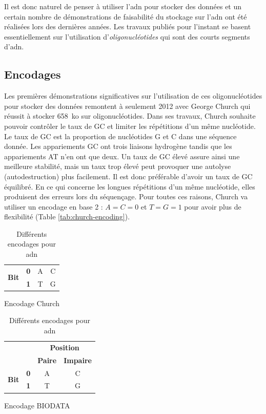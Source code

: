 \documentclass[a4paper]{report}
\begin{document}
Il est donc naturel de penser à utiliser l’\ac{adn} pour stocker des données
et un certain nombre de démonstrations de faisabilité du stockage sur l’\ac{adn} ont été réalisées lors des dernières années.
Les travaux publiés pour l’instant se basent essentiellement sur l’utilisation d’\emph{oligonucléotides} qui sont des courts segments d’\ac{adn}.

\subsection{Encodages}

Les premières démonstrations significatives sur l’utilisation de ces oligonucléotides pour stocker des données remontent à seulement 2012 avec George Church \cite{church2012next} qui réussit à stocker 658~ko sur  oligonucléotides.
Dans ses travaux, Church souhaite pouvoir contrôler le taux de GC et limiter les répétitions d’un même nucléotide.
Le taux de GC est la proportion de nucléotides G et C dans une séquence donnée. 
Les appariements GC ont trois liaisons hydrogène tandis que les appariements AT n'en ont que deux.
Un taux de GC élevé assure ainsi une meilleure stabilité, mais un taux trop élevé peut provoquer une autolyse (autodestruction) plus facilement.
Il est donc préférable d’avoir un taux de GC équilibré.
En ce qui concerne les longues répétitions d’un même nucléotide, elles produisent des erreurs lors du séquençage.
Pour toutes ces raisons, Church va utiliser un encodage en base 2 : $A=C=0$ et $T=G=1$ pour avoir plus de flexibilité (Table \ref{tab:church-encoding}).

\begin{table}[ht]
\centering
\setlength{\tabcolsep}{.8em}
\renewcommand\arraystretch{1.5}

\begin{subtable}[t]{.45\textwidth}
  \centering
  \begin{tabular}{|c|c|c|c|}
  \hline
  \multirow{2}{*}{\textbf{Bit}} & \textbf{0} & A & C \\
  \cline{2-4}
  & \textbf{1} & T & G \\
  \hline
  \end{tabular}
  \caption{Encodage Church}
  \label{tab:church-encoding}
\end{subtable}
\hfill
\begin{subtable}[t]{.54\textwidth}
  \centering
  \begin{tabular}{|c|c|c|c|}
  \cline{3-4}
  \multicolumn{2}{c|}{} & \multicolumn{2}{c|}{\textbf{Position}} \\
  \cline{3-4}
  \multicolumn{2}{c|}{} & \textbf{Paire} & \textbf{Impaire} \\
  \hline
  \multirow{2}{*}{\textbf{Bit}} & \textbf{0} & A & C \\
  \cline{2-4}
  & \textbf{1} & T & G \\
  \hline
  \end{tabular}
  \caption{Encodage BIODATA}
  \label{tab:biodata-encoding}
\end{subtable}

\caption{Différents encodages pour \ac{adn}}
\label{tab:dna-encodings}
\end{table}
\end{document}
